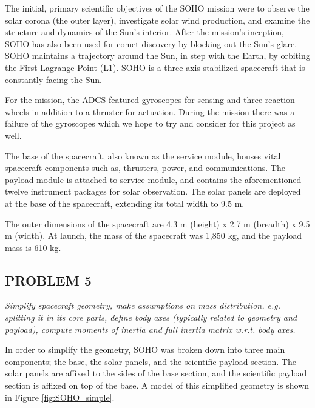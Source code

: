 \documentclass[12pt,a4paper,notitlepage]{article}
\begin{document}
The initial, primary scientific objectives of the SOHO mission were to observe the solar corona (the outer layer), investigate solar wind production, and examine the structure and dynamics of the Sun's interior. After the mission's inception, SOHO has also been used for comet discovery by blocking out the Sun's glare. SOHO maintains a trajectory around the Sun, in step with the Earth, by orbiting the First Lagrange Point (L1). SOHO is a three-axis stabilized spacecraft that is constantly facing the Sun.

For the mission, the ADCS featured gyroscopes for sensing and three reaction wheels in addition to a thruster for actuation. During the mission there was a failure of the gyroscopes which we hope to try and consider for this project as well. 

The base of the spacecraft, also known as the service module, houses vital spacecraft components such as, thrusters, power, and communications. The payload module is attached to service module, and contains the aforementioned twelve instrument packages for solar observation. The solar panels are deployed at the base of the spacecraft, extending its total width to 9.5 m. 

The outer dimensions of the spacecraft are 4.3 m (height) x 2.7 m (breadth) x 9.5 m (width). At launch, the mass of the spacecraft was 1,850 kg, and the payload mass is 610 kg.

\subsection{PROBLEM 5} \label{geometry}
\textit{Simplify spacecraft geometry, make assumptions on mass distribution, e.g. splitting it in its core parts,
define body axes (typically related to geometry and payload), compute moments of inertia and full inertia
matrix w.r.t. body axes.}

In order to simplify the geometry, SOHO was broken down into three main components; the base, the solar panels, and the scientific payload section. The solar panels are affixed to the sides of the base section, and the scientific payload section is affixed on top of the base. A model of this simplified geometry is shown in Figure \ref{fig:SOHO_simple}.
\end{document}
